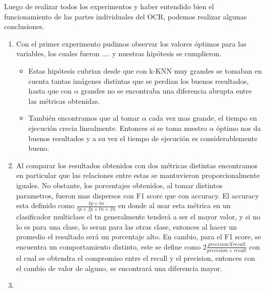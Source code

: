 Luego de realizar todos los experimentos y haber entendido bien el funcionamiento de las partes individuales del OCR, podemos realizar algunas conclusiones.

\begin{enumerate}
	\item Con el primer experimento pudimos observar los valores óptimos para las variables, los cuales fueron .... y nuestras hipótesis se cumplieron. 
	\begin{itemize}
		\item Estas hipótesis cubrian desde que con k-KNN muy grandes se tomaban en cuenta tantas imágenes distintas que se perdian los buenos resultados, hasta que con $\alpha$ grandes no se encontraba una diferencia abrupta entre las métricas obtenidas.
		\item También encontramos que al tomar $\alpha$ cada vez mas grande, el tiempo en ejecución crecia linealmente. Entonces si se toma nuestro $\alpha$ óptimo nos da buenos resultados y a su vez el tiempo de ejecución es considerablemente bueno.
	\end{itemize}
	\item Al comparar los resultados obtenidos con dos métricas distintas encontramos en particular que las relaciones entre estas se mantuvieron proporcionalmente iguales. No obstante, los porcentajes obtenidos, al tomar distintos parametros, fueron mas dispersos con F1 score que con accuracy. El accuracy esta definido como $\frac{tp + tn}{tp + fp + tn + fn}$ en donde al usar esta métrica en un clasificador multiclase el tn generalmente tenderá a ser el mayor valor, y si no lo es para una clase, lo seran para las otras clase, entonces al hacer un promedio el resultado será un porcentaje alto. En cambio, para el F1 score, se encuentra un comportamiento distinto, este se define como 2$\frac{precisionXrecall}{precision + recall}$ con el cual se obtendra el compromiso entre el recall y el precision, entonces con el cambio de valor de alguno, se encontrará una diferencia mayor.
	\item 

\end{enumerate}